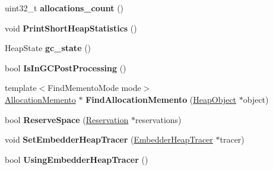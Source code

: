 \begin{DoxyCompactItemize}
\item 
uint32\+\_\+t {\bfseries allocations\+\_\+count} ()\hypertarget{classv8_1_1internal_1_1_heap_a3e8866dba0ce694b4f826228545b9c01}{}\label{classv8_1_1internal_1_1_heap_a3e8866dba0ce694b4f826228545b9c01}

\item 
void {\bfseries Print\+Short\+Heap\+Statistics} ()\hypertarget{classv8_1_1internal_1_1_heap_abc8708f833d8dee1ed93051d3fb4690e}{}\label{classv8_1_1internal_1_1_heap_abc8708f833d8dee1ed93051d3fb4690e}

\item 
Heap\+State {\bfseries gc\+\_\+state} ()\hypertarget{classv8_1_1internal_1_1_heap_a0d9f57dc1f21bd86c17a7abf1766ccd4}{}\label{classv8_1_1internal_1_1_heap_a0d9f57dc1f21bd86c17a7abf1766ccd4}

\item 
bool {\bfseries Is\+In\+G\+C\+Post\+Processing} ()\hypertarget{classv8_1_1internal_1_1_heap_aa6bdb0010eb8a30010560de3fe7e18f8}{}\label{classv8_1_1internal_1_1_heap_aa6bdb0010eb8a30010560de3fe7e18f8}

\item 
{\footnotesize template$<$Find\+Memento\+Mode mode$>$ }\\\hyperlink{classv8_1_1internal_1_1_allocation_memento}{Allocation\+Memento} $\ast$ {\bfseries Find\+Allocation\+Memento} (\hyperlink{classv8_1_1internal_1_1_heap_object}{Heap\+Object} $\ast$object)\hypertarget{classv8_1_1internal_1_1_heap_a8b502802fc993c399bbc3194fbc9bce6}{}\label{classv8_1_1internal_1_1_heap_a8b502802fc993c399bbc3194fbc9bce6}

\item 
bool {\bfseries Reserve\+Space} (\hyperlink{classv8_1_1internal_1_1_list}{Reservation} $\ast$reservations)\hypertarget{classv8_1_1internal_1_1_heap_a54a7c2d6f2a71c5751ee314dea1bda9c}{}\label{classv8_1_1internal_1_1_heap_a54a7c2d6f2a71c5751ee314dea1bda9c}

\item 
void {\bfseries Set\+Embedder\+Heap\+Tracer} (\hyperlink{classv8_1_1_embedder_heap_tracer}{Embedder\+Heap\+Tracer} $\ast$tracer)\hypertarget{classv8_1_1internal_1_1_heap_a4fbf6948a032ed6103fc841b361b550a}{}\label{classv8_1_1internal_1_1_heap_a4fbf6948a032ed6103fc841b361b550a}

\item 
bool {\bfseries Using\+Embedder\+Heap\+Tracer} ()\hypertarget{classv8_1_1internal_1_1_heap_ab0bc5bac39b252dfb00bf3c526747fc6}{}\label{classv8_1_1internal_1_1_heap_ab0bc5bac39b252dfb00bf3c526747fc6}


\end{DoxyCompactItemize}
